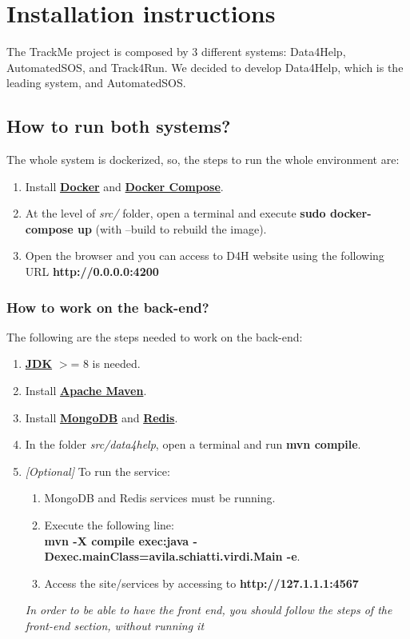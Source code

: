 \documentclass[a4paper, hidelinks, 12pt]{report}
\begin{document}
	\chapter{Installation instructions}
The TrackMe project is composed by 3 different systems: Data4Help, AutomatedSOS, and Track4Run. We decided to develop Data4Help, which is the leading system, and AutomatedSOS.

	\section{How to run both systems?}
	The whole system is dockerized, so, the steps to run the whole environment are:

	\begin{enumerate}
	\item Install \href{https://docs.docker.com/install/}{\textbf{Docker}} and \href{https://docs.docker.com/compose/install/}{\textbf{Docker Compose}}.
	\item At the level of \textit{src/} folder, open a terminal and execute
	\textbf{sudo docker-compose up} (with --build to rebuild the image).
	\item Open the browser and you can access to D4H website using the following URL
		\textbf{http://0.0.0.0:4200}
	\end{enumerate}

	\subsection{How to work on the back-end?}
	The following are the steps needed to work on the back-end:

	\begin{enumerate}
	\item \href{https://www.oracle.com/technetwork/java/javase/downloads/index.html}{\textbf{JDK}}  $>$= 8 is needed.
	\item Install \href{https://maven.apache.org/what-is-maven.html}{\textbf{Apache Maven}}.
	\item Install \href{https://docs.mongodb.com/manual/installation/}{\textbf{MongoDB}}  and \href{https://redis.io/download}{\textbf{Redis}}.
	\item In the folder \textit{src/data4help}, open a terminal and run \textbf{mvn compile}.
	\item \textit{[Optional]} To run the service:
		\begin{enumerate}
		\item MongoDB and Redis services must be running.
		\item Execute the following line:\\
		\textbf{ mvn -X compile exec:java -Dexec.mainClass=avila.schiatti.virdi.Main -e}.
		\item Access the site/services by accessing to \textbf{http://127.1.1.1:4567}
		\end{enumerate}

	\textit{	In order to be able to have the front end, you should follow the steps of the front-end section, without running it}
	\end{enumerate}
\end{document}
